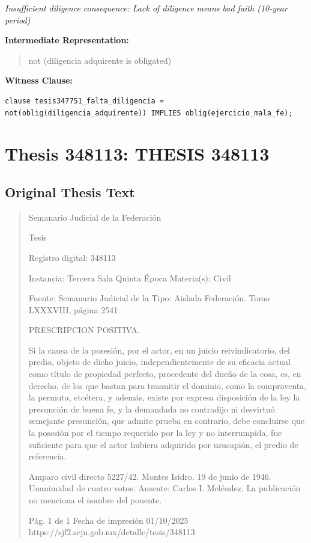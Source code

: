 \documentclass[11pt,a4paper]{article}
\begin{document}
\textit{Insufficient diligence consequence: Lack of diligence means bad faith (10-year period)}

\textbf{Intermediate Representation:}

\begin{quote}
not (diligencia adquirente is obligated)
\end{quote}

\textbf{Witness Clause:}

\begin{lstlisting}[style=witnessstyle, language=Witness]
clause tesis347751_falta_diligencia = not(oblig(diligencia_adquirente)) IMPLIES oblig(ejercicio_mala_fe);
\end{lstlisting}

\newpage

\section{Thesis 348113: THESIS 348113}
\label{thesis:348113}

\subsection{Original Thesis Text}

\begin{quote}
                                                   Semanario Judicial de la Federación

                                                  Tesis

 Registro digital: 348113

 Instancia: Tercera Sala            Quinta Época                            Materia(s): Civil

                                    Fuente: Semanario Judicial de la        Tipo: Aislada
                                    Federación.
                                    Tomo LXXXVIII, página 2541


PRESCRIPCION POSITIVA.


Si la causa de la posesión, por el actor, en un juicio reivindicatorio, del predio, objeto de dicho juicio,
independientemente de su eficacia actual como título de propiedad perfecto, procedente del dueño
de la cosa, es, en derecho, de los que bastan para trasmitir el dominio, como la compraventa, la
permuta, etcétera, y además, existe por expresa disposición de la ley la presunción de buena fe, y la
demandada no contradijo ni desvirtuó semejante presunción, que admite prueba en contrario, debe
concluirse que la posesión por el tiempo requerido por la ley y no interrumpida, fue suficiente para
que el actor hubiera adquirido por usucapión, el predio de referencia.


Amparo civil directo 5227/42. Montes Isidro. 19 de junio de 1946. Unanimidad de cuatro votos.
Ausente: Carlos I. Meléndez. La publicación no menciona el nombre del ponente.




                                               Pág. 1 de 1              Fecha de impresión 01/10/2025
  https://sjf2.scjn.gob.mx/detalle/tesis/348113

\end{quote}
\end{document}
